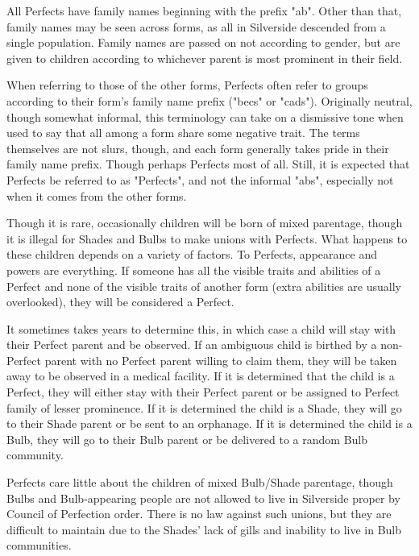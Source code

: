\documentclass[blue]{Silversiders}
\begin{document}
All Perfects have family names beginning with the prefix "ab". Other than that, family names may be seen across forms, as all in Silverside descended from a single population. Family names are passed on not according to gender, but are given to children according to whichever parent is most prominent in their field. 

When referring to those of the other forms, Perfects often refer to groups according to their form's family name prefix ("becs" or "cads"). Originally neutral, though somewhat informal, this terminology can take on a dismissive tone when used to say that all among a form share some negative trait. The terms themselves are not slurs, though, and each form generally takes pride in their family name prefix. Though perhaps Perfects most of all. Still, it is expected that Perfects be referred to as "Perfects", and not the informal "abs", especially not when it comes from the other forms.

Though it is rare, occasionally children will be born of mixed parentage, though it is illegal for Shades and Bulbs to make unions with Perfects. What happens to these children depends on a variety of factors. To Perfects, appearance and powers are everything. If someone has all the visible traits and abilities of a Perfect and none of the visible traits of another form (extra abilities are usually overlooked), they will be considered a Perfect. 

It sometimes takes years to determine this, in which case a child will stay with their Perfect parent and be observed. If an ambiguous child is birthed by a non-Perfect parent with no Perfect parent willing to claim them, they will be taken away to be observed in a medical facility. If it is determined that the child is a Perfect, they will either stay with their Perfect parent or be assigned to Perfect family of lesser prominence. If it is determined the child is a Shade, they will go to their Shade parent or be sent to an orphanage. If it is determined the child is a Bulb, they will go to their Bulb parent or be delivered to a random Bulb community. 

Perfects care little about the children of mixed Bulb/Shade parentage, though Bulbs and Bulb-appearing people are not allowed to live in Silverside proper by Council of Perfection order. There is no law against such unions, but they are difficult to maintain due to the Shades' lack of gills and inability to live in Bulb communities.
\end{document}
